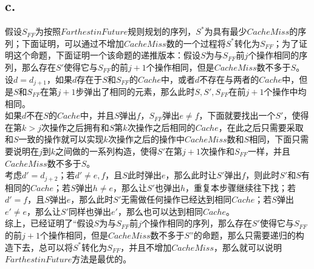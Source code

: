 \documentclass{article}
\begin{document}
    \subsection*{c.}
        假设$S_{FF}$为按照$Farthest in Future$规则规划的序列，$S^*$为具有最少$Cache Miss$的序列；下面证明，可以通过不增加$Cache Miss$数的一个过程将$S^*$转化为$S_{FF}$；为了证明这个命题，下面证明一个该命题的递推版本：假设$S$为与$S_{FF}$前$j$个操作相同的序列，那么存在$S'$使得它与$S_{FF}$的前$j+1$个操作相同，但是$Cache Miss$数不多于$S$。\\
        设$d=d_{j+1}$，如果$d$存在于$S$和$S_{FF}$的$Cache$中，或者$d$不存在与两者的$Cache$中，但是$S$和$S_{FF}$在第$j+1$步弹出了相同的元素，那么此时$S,S',S_{FF}$在前$j+1$个操作中均相同。\\
        如果$d$不在$S$的$Cache$中，并且$S$弹出$f$，$S_{FF}$弹出$e \neq f$，下面就要找出一个$S'$，使得在第$k>j$次操作之后拥有和$S$第$k$次操作之后相同的$Cache$，在此之后只需要采取和$S$一致的操作就可以实现$k$次操作之后的操作中$Cache Miss$数和$S$相同，下面只需要说明在$j$到$k$之间做的一系列构造，使得$S'$在第$j+1$次操作和$S_{FF}$一样，并且$Cache Miss$数不多于$S$。\\
        考虑$d'=d_{j+2}$；若$d'\neq e,f$，且$S$此时弹出$e$，那么此时让$S'$弹出$f$，则此时$S'$和$S$有相同的$Cache$；若$S$弹出$h \neq e$，那么让$S'$也弹出$h$，重复本步骤继续往下找；若$d'=f$，且$S$弹出$e$，那么此时$S'$无需做任何操作已经达到相同$Cache$；若$S$弹出$e' \neq e$，那么让$S'$同样也弹出$e'$，那么也可以达到相同$Cache$。\\
        综上，已经证明了“假设$S$为与$S_{FF}$前$j$个操作相同的序列，那么存在$S'$使得它与$S_{FF}$的前$j+1$个操作相同，但是$Cache Miss$数不多于$S$”的命题，那么只需要递归的构造下去，总可以将$S^*$转化为$S_{FF}$，并且不增加$Cache Miss$，那么就可以说明$Farthest in Future$方法是最优的。
\end{document}
